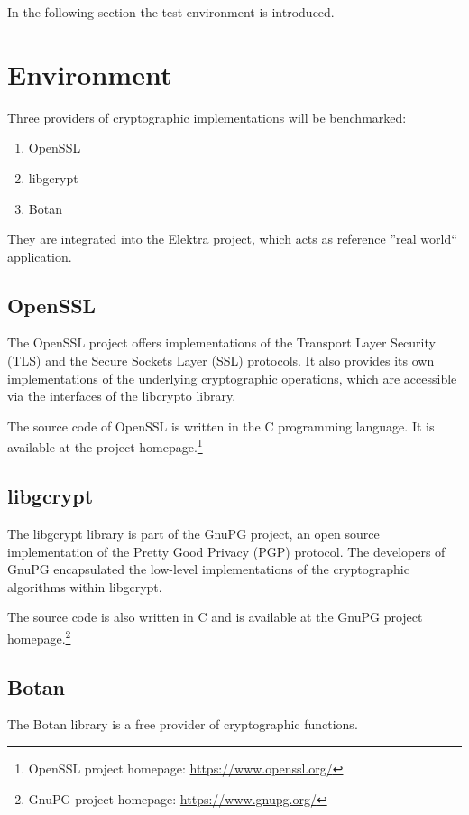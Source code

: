 In the following section the test environment is introduced.

\section{Environment}

Three providers of cryptographic implementations will be benchmarked:

\begin{enumerate}
\item OpenSSL
\item libgcrypt
\item Botan
\end{enumerate}

They are integrated into the Elektra project, which acts as reference ''real world`` application.

	\subsection{OpenSSL}

The OpenSSL project offers implementations of the Transport Layer Security (TLS) and the Secure Sockets Layer (SSL) protocols.
It also provides its own implementations of the underlying cryptographic operations, which are accessible via the interfaces of the libcrypto library.

The source code of OpenSSL is written in the C programming language.
It is available at the project homepage.\footnote{OpenSSL project homepage: \url{https://www.openssl.org/}}

	\subsection{libgcrypt}

The libgcrypt library is part of the GnuPG project, an open source implementation of the Pretty Good Privacy (PGP) protocol.
The developers of GnuPG encapsulated the low-level implementations of the cryptographic algorithms within libgcrypt.

The source code is also written in C and is available at the GnuPG project homepage.\footnote{GnuPG project homepage: \url{https://www.gnupg.org/}}

	\subsection{Botan}

The Botan library is a free provider of cryptographic functions.

